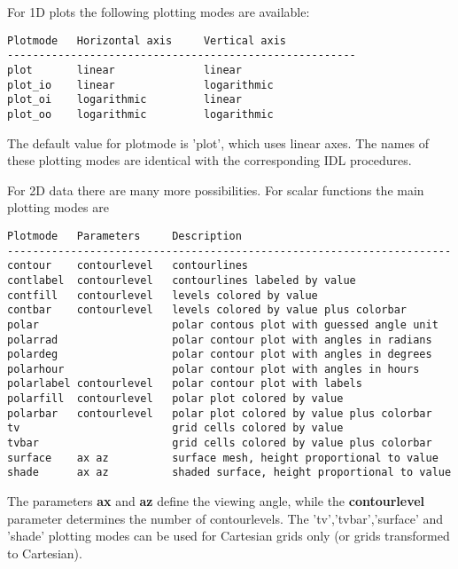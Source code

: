 \documentclass{article}
\begin{document}
For 1D plots the following plotting modes are available: 
\begin{verbatim}
Plotmode   Horizontal axis     Vertical axis
-------------------------------------------------------
plot       linear              linear
plot_io    linear              logarithmic
plot_oi    logarithmic         linear
plot_oo    logarithmic         logarithmic
\end{verbatim}
The default value for plotmode is 'plot', which uses linear axes.
The names of these plotting modes are identical with the corresponding IDL
procedures.

For 2D data there are many more possibilities.
For scalar functions the main plotting modes are 
\begin{verbatim}
Plotmode   Parameters     Description
----------------------------------------------------------------------
contour    contourlevel   contourlines
contlabel  contourlevel   contourlines labeled by value
contfill   contourlevel   levels colored by value
contbar    contourlevel   levels colored by value plus colorbar
polar                     polar contous plot with guessed angle unit
polarrad                  polar contour plot with angles in radians
polardeg                  polar contour plot with angles in degrees
polarhour                 polar contour plot with angles in hours
polarlabel contourlevel   polar contour plot with labels
polarfill  contourlevel   polar plot colored by value
polarbar   contourlevel   polar plot colored by value plus colorbar
tv                        grid cells colored by value
tvbar                     grid cells colored by value plus colorbar
surface    ax az          surface mesh, height proportional to value
shade      ax az          shaded surface, height proportional to value
\end{verbatim}
The parameters {\bf ax} and {\bf az} define the viewing angle,
while the {\bf contourlevel} parameter determines the number 
of contourlevels. The 'tv','tvbar','surface' and 'shade' plotting modes
can be used for Cartesian grids only (or grids transformed to Cartesian).
\end{document}
